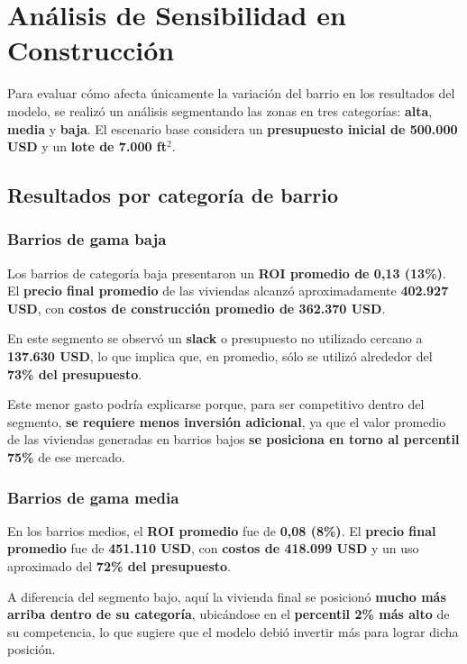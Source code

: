 \section{Análisis de Sensibilidad en Construcción}

Para evaluar cómo afecta únicamente la variación del barrio en los resultados del modelo, se realizó un análisis segmentando las zonas en tres categorías: \textbf{alta}, \textbf{media} y \textbf{baja}. El escenario base considera un \textbf{presupuesto inicial de 500.000 USD} y un \textbf{lote de 7.000 ft$^2$}.

\subsection{Resultados por categoría de barrio}

\subsubsection{Barrios de gama baja}

Los barrios de categoría baja presentaron un \textbf{ROI promedio de 0{,}13 (13\%)}. El \textbf{precio final promedio} de las viviendas alcanzó aproximadamente \textbf{402.927 USD}, con \textbf{costos de construcción promedio de 362.370 USD}.

En este segmento se observó un \textbf{slack} o presupuesto no utilizado cercano a \textbf{137.630 USD}, lo que implica que, en promedio, sólo se utilizó alrededor del \textbf{73\% del presupuesto}.

Este menor gasto podría explicarse porque, para ser competitivo dentro del segmento, \textbf{se requiere menos inversión adicional}, ya que el valor promedio de las viviendas generadas en barrios bajos \textbf{se posiciona en torno al percentil 75\%} de ese mercado.

\subsubsection{Barrios de gama media}

En los barrios medios, el \textbf{ROI promedio} fue de \textbf{0{,}08 (8\%)}. El \textbf{precio final promedio} fue de \textbf{451.110 USD}, con \textbf{costos de 418.099 USD} y un uso aproximado del \textbf{72\% del presupuesto}.

A diferencia del segmento bajo, aquí la vivienda final se posicionó \textbf{mucho más arriba dentro de su categoría}, ubicándose en el \textbf{percentil 2\% más alto} de su competencia, lo que sugiere que el modelo debió invertir más para lograr dicha posición.

